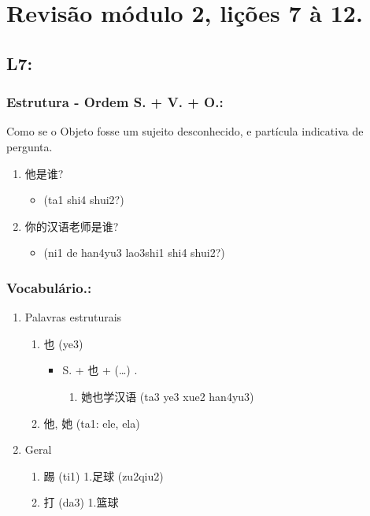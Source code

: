 \documentclass[11pt]{article}
\date{\today}
\title{}
\begin{document}
\tableofcontents


\section{Revisão módulo 2, lições 7 à 12.}
\label{sec:org15b4410}

\subsection{L7:}
\label{sec:org4624666}
\subsubsection{Estrutura - Ordem S. + V. + O.:}
\label{sec:org221d56d}
Como se o Objeto fosse um sujeito desconhecido, e partícula indicativa
de pergunta.

\begin{enumerate}
\item 他是谁?
\begin{itemize}
\item (ta1 shi4 shui2?)
\end{itemize}

\item 你的汉语老师是谁?
\begin{itemize}
\item (ni1 de han4yu3 lao3shi1 shi4 shui2?)
\end{itemize}
\end{enumerate}

\subsubsection{Vocabulário.:}
\label{sec:orga8e4a9f}
\begin{enumerate}
\item Palavras estruturais
\label{sec:orgc7337f2}
\begin{enumerate}
\item 也 (ye3)
\begin{itemize}
\item S. + 也 + (\ldots{}) .
\begin{enumerate}
\item 她也学汉语 (ta3 ye3 xue2 han4yu3)
\end{enumerate}
\end{itemize}

\item 他, 她 (ta1: ele, ela)
\end{enumerate}

\item Geral
\label{sec:org4254bc4}
\begin{enumerate}
\item 踢 (ti1)
1.足球 (zu2qiu2)

\item 打 (da3)
1.篮球
\end{enumerate}
\end{enumerate}
\end{document}
